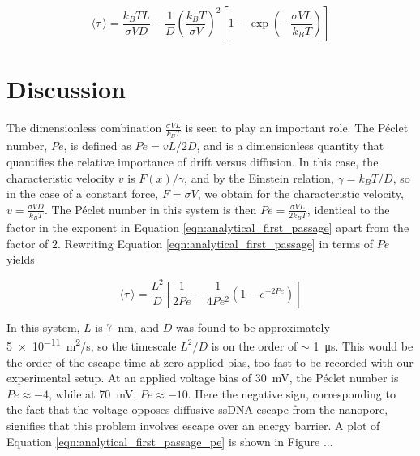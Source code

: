 \begin{equation}
\langle \tau \, \rangle = \frac{k_B T L}{\sigma V D} - \frac{1}{D} \left( \frac{k_B T}{\sigma V} \right) ^2 \left[ 1 - \exp{ \left( - \frac{\sigma V L}{k_B T} \right) } \right]
\label{eqn:analytical_first_passage}
\end{equation}

\section{Discussion}

The dimensionless combination $\frac{\sigma V L}{k_B T}$ is seen to play an important role.  The Péclet number, $Pe$, is defined as $Pe = v L / 2 D$, and is a dimensionless quantity that quantifies the relative importance of drift versus diffusion.  In this case, the characteristic velocity $v$ is $F(x)/\gamma$, and by the Einstein relation, $\gamma=k_B T / D$, so in the case of a constant force, $F = \sigma V$, we obtain for the characteristic velocity, $v=\frac{\sigma V D}{k_B T}$.  The Péclet number in this system is then $Pe=\frac{\sigma V L}{2 k_B T}$, identical to the factor in the exponent in Equation \ref{eqn:analytical_first_passage} apart from the factor of $2$.  Rewriting Equation \ref{eqn:analytical_first_passage} in terms of $Pe$ yields \citep{Redner2001}

\begin{equation}
\langle \tau \, \rangle = \frac{L^2}{D} \left[ \frac{1}{2 Pe} - \frac{1}{4 Pe^2} \left( 1 - e^{-2Pe} \right) \right]
\label{eqn:analytical_first_passage_pe}
\end{equation}

In this system, $L$ is \SI{7}{\nm}, and $D$ was found to be approximately \SI{5e-11}{\m^2/\s}, so the timescale $L^2/D$ is on the order of $\sim$ \SI{1}{\us}.  This would be the order of the escape time at zero applied bias, too fast to be recorded with our experimental setup.  At an applied voltage bias of \SI{30}{\mV}, the Péclet number is $Pe \approx -4$, while at \SI{70}{\mV}, $Pe \approx -10$.  Here the negative sign, corresponding to the fact that the voltage opposes diffusive ssDNA escape from the nanopore, signifies that this problem involves escape over an energy barrier.  A plot of Equation \ref{eqn:analytical_first_passage_pe} is shown in Figure ...

